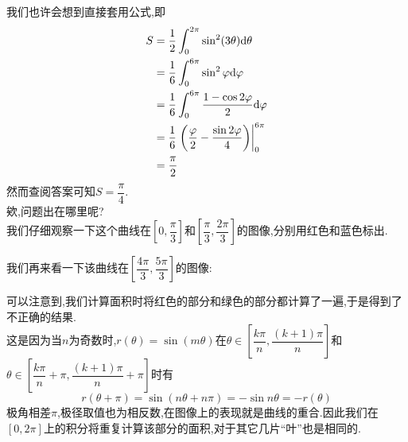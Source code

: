 \documentclass{ctexart}
\begin{document}
\begin{analyze}[Analysis.]
    我们也许会想到直接套用公式,即
    $$\begin{aligned}
        S
        &= \dfrac{1}{2}\int_{0}^{2\pi}\sin^2(3\theta)\mathrm{d}\theta \\
        &= \dfrac{1}{6}\int_{0}^{6\pi}\sin^2\varphi\mathrm{d}\varphi \\
        &= \dfrac{1}{6}\int_{0}^{6\pi}\dfrac{1-\cos2\varphi}{2}\mathrm{d}\varphi \\
        &= \dfrac{1}{6}\left.\left(\dfrac{\varphi}{2}-\dfrac{\sin2\varphi}{4}\right)\right|_0^{6\pi} \\
        &= \dfrac{\pi}{2}
    \end{aligned}$$
    然而查阅答案可知$S=\dfrac{\pi}{4}$.\\
    欸,问题出在哪里呢?\\
    我们仔细观察一下这个曲线在$\left[0,\dfrac{\pi}{3}\right]$和$\left[\dfrac{\pi}{3},\dfrac{2\pi}{3}\right]$的图像,分别用红色和蓝色标出.
    \begin{center}
    \end{center}
    我们再来看一下该曲线在$\left[\dfrac{4\pi}{3},\dfrac{5\pi}{3}\right]$的图像:
    \begin{center}
    \end{center}
    可以注意到,我们计算面积时将红色的部分和绿色的部分都计算了一遍,于是得到了不正确的结果.\\
    这是因为当$n$为奇数时,$r(\theta)=\sin(m\theta)$在$\theta\in\left[\dfrac{k\pi}{n},\dfrac{(k+1)\pi}{n}\right]$和$\theta\in\left[\dfrac{k\pi}{n}+\pi,\dfrac{(k+1)\pi}{n}+\pi\right]$时有
    $$r(\theta+\pi)=\sin\left(n\theta+n\pi\right)=-\sin{n\theta}=-r(\theta)$$
    极角相差$\pi$,极径取值也为相反数,在图像上的表现就是曲线的重合.因此我们在$[0,2\pi]$上的积分将重复计算该部分的面积,对于其它几片“叶”也是相同的.\\

\end{analyze}
\end{document}
